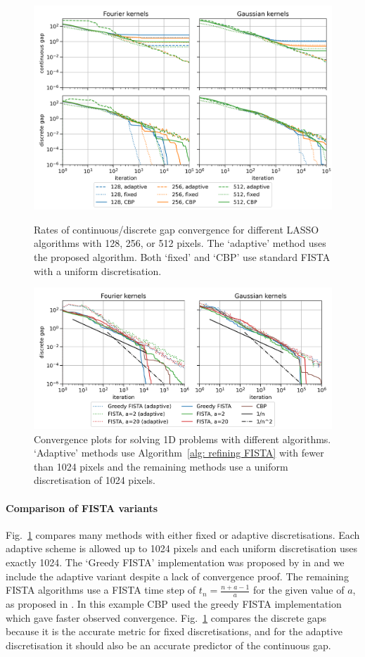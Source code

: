 \documentclass[smallextended]{svjour3}
\newcommand{\1}{\F{1}}
\begin{document}
	\begin{figure}\centering
		\includegraphics[width=.86\textwidth]{lasso_ndofs_convergence}
		\caption{Rates of continuous/discrete gap convergence for different LASSO algorithms with 128, 256, or 512 pixels. The `adaptive' method uses the proposed algorithm. Both `fixed' and `CBP' use standard FISTA with a uniform discretisation.}\label{fig: convergence with ndofs}
		
		\vspace*{\floatsep}
		
		\includegraphics[width=.86\textwidth]{lasso_convergence_short}
		\caption{Convergence plots for solving 1D problems with different algorithms. `Adaptive' methods use Algorithm~\ref{alg: refining FISTA} with fewer than 1024 pixels and the remaining methods use a uniform discretisation of 1024 pixels.}\label{fig: convergence with method}
	\end{figure}
	
	
	\paragraph{Comparison of FISTA variants}
	Fig.~\ref{fig: convergence with method} compares many methods with either fixed or adaptive discretisations. Each adaptive scheme is allowed up to 1024 pixels and each uniform discretisation uses exactly 1024. The `Greedy FISTA' implementation was proposed by in \cite{Liang2018} and we include the adaptive variant despite a lack of convergence proof. The remaining FISTA algorithms use a FISTA time step of $t_n = \frac{n+a-1}{a}$ for the given value of $a$, as proposed in \cite{Chambolle2015}. In this example CBP used the greedy FISTA implementation which gave faster observed convergence. Fig.~\ref{fig: convergence with method} compares the discrete gaps because it is the accurate metric for fixed discretisations, and for the adaptive discretisation it should also be an accurate predictor of the continuous gap. 
	
\end{document}
